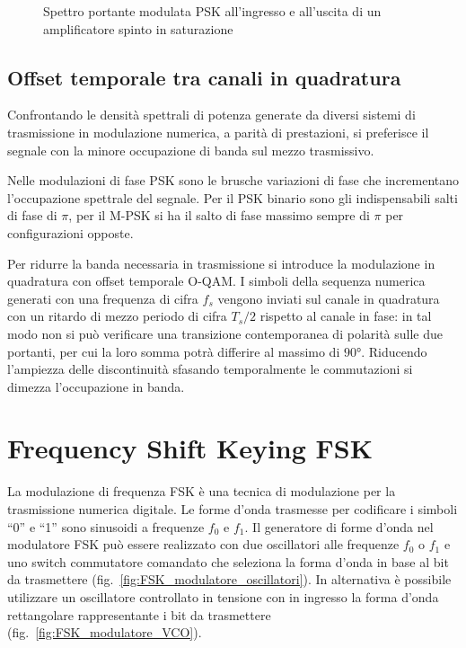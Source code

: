 \begin{figure}[ht!]\centering
	\caption{Spettro portante modulata \ac{PSK} all'ingresso e all'uscita di un amplificatore spinto in saturazione}
	\label{fig:portante_squadrata_PSK}
\end{figure}

\subsection{Offset temporale tra canali in quadratura}
Confrontando le densità spettrali di potenza generate da diversi sistemi di trasmissione in modulazione numerica, a parità di prestazioni, si preferisce il segnale con la minore occupazione di banda sul mezzo trasmissivo.

Nelle modulazioni di fase \ac{PSK} sono le brusche variazioni di fase che incrementano l'occupazione spettrale del segnale. Per il \ac{PSK} binario sono gli indispensabili salti di fase di $\pi$, per il M-\ac{PSK} si ha il salto di fase massimo sempre di $\pi$ per configurazioni opposte.

Per ridurre la banda necessaria in trasmissione si introduce la modulazione in quadratura con offset temporale O-\ac{QAM}.
I simboli della sequenza numerica generati con una frequenza di cifra $f_s$ vengono inviati sul canale in quadratura con un ritardo di mezzo periodo di cifra $T_s/2$ rispetto al canale in fase: in tal modo non si può verificare una transizione contemporanea di polarità sulle due portanti, per cui la loro somma potrà differire al massimo di $\ang{90}$. Riducendo l'ampiezza delle discontinuità sfasando temporalmente le commutazioni si dimezza l'occupazione in banda.

\clearpage
\section{Frequency Shift Keying \ac{FSK}}
La modulazione di frequenza \ac{FSK} è una tecnica di modulazione per la trasmissione numerica digitale. Le forme d'onda trasmesse per codificare i simboli “0” e “1” sono sinusoidi a frequenze $f_0$ e $f_1$. Il generatore di forme d'onda nel modulatore \ac{FSK} può essere realizzato con due oscillatori alle frequenze $f_0$ o $f_1$ e uno switch commutatore comandato che seleziona la forma d'onda in base al bit da trasmettere (fig.~\ref{fig:FSK_modulatore_oscillatori}). In alternativa è possibile utilizzare un oscillatore controllato in tensione con in ingresso la forma d'onda rettangolare rappresentante i bit da trasmettere (fig.~\ref{fig:FSK_modulatore_VCO}).

